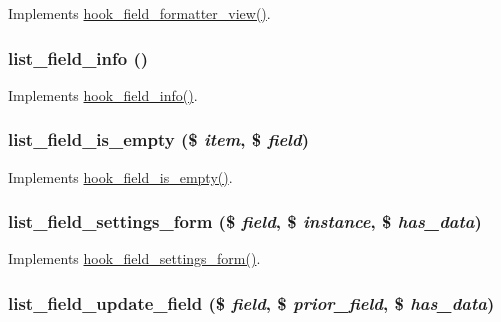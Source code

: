 \label{list_8module_a8747111b6404b34d812a851224ea2062}
Implements \hyperlink{group__field__formatter_gaa588d99481fa147a1c88416e55fdfad6}{hook\_\-field\_\-formatter\_\-view()}. \hypertarget{list_8module_a063622318fd99746c6ea7b806334d006}{
\subsubsection[{list\_\-field\_\-info}]{\setlength{\rightskip}{0pt plus 5cm}list\_\-field\_\-info ()}}
\label{list_8module_a063622318fd99746c6ea7b806334d006}
Implements \hyperlink{group__field__types_gad3eb779f26f41b520f19af011ece3eb1}{hook\_\-field\_\-info()}. \hypertarget{list_8module_a786db9c0c17b7e8be8f308ad9270deb6}{
\subsubsection[{list\_\-field\_\-is\_\-empty}]{\setlength{\rightskip}{0pt plus 5cm}list\_\-field\_\-is\_\-empty (\$ {\em item}, \/  \$ {\em field})}}
\label{list_8module_a786db9c0c17b7e8be8f308ad9270deb6}
Implements \hyperlink{group__field__types_ga192dd7e7a02a7bc9e0af8b67b187b071}{hook\_\-field\_\-is\_\-empty()}. \hypertarget{list_8module_a17f5bcfffcb1264c027462c2d931f71e}{
\subsubsection[{list\_\-field\_\-settings\_\-form}]{\setlength{\rightskip}{0pt plus 5cm}list\_\-field\_\-settings\_\-form (\$ {\em field}, \/  \$ {\em instance}, \/  \$ {\em has\_\-data})}}
\label{list_8module_a17f5bcfffcb1264c027462c2d931f71e}
Implements \hyperlink{group__field__types_gab8a2ed808857cc6f3cb661fbc99d30d4}{hook\_\-field\_\-settings\_\-form()}. \hypertarget{list_8module_affec6e81ffd24248ec77ad48fb659e78}{
\subsubsection[{list\_\-field\_\-update\_\-field}]{\setlength{\rightskip}{0pt plus 5cm}list\_\-field\_\-update\_\-field (\$ {\em field}, \/  \$ {\em prior\_\-field}, \/  \$ {\em has\_\-data})}}
